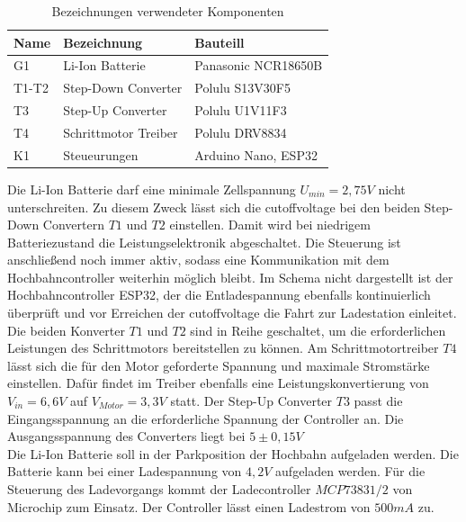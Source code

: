 \begin{table}[h]
	\begin{center}
		\begin{tabular}[h]{l|l|l}
			\textbf{Name} & \textbf{Bezeichnung} & \textbf{Bauteill}\\
			\hline
			G1 & Li-Ion Batterie & Panasonic NCR18650B\\
			\hline
			T1-T2 & Step-Down Converter & Polulu S13V30F5\\
			\hline
			T3 & Step-Up Converter & Polulu U1V11F3\\
			\hline
			T4 & Schrittmotor Treiber & Polulu DRV8834 \\
			\hline
			K1 & Steueurungen & Arduino Nano, ESP32 \\
		\end{tabular}
	\end{center}
	\caption{Bezeichnungen verwendeter Komponenten}
	\label{tbl:leistungskonvertierung}
\end{table}
\newpage

Die Li-Ion Batterie darf eine minimale Zellspannung $U_{min} =2,75V$ nicht unterschreiten. Zu diesem Zweck lässt sich die \acrshort{cutoffvoltage} bei den beiden Step-Down Convertern $T1$ und $T2$ einstellen. Damit wird bei  niedrigem Batteriezustand die Leistungselektronik abgeschaltet. Die Steuerung ist anschließend noch immer aktiv, sodass eine Kommunikation mit dem Hochbahncontroller weiterhin möglich bleibt. Im Schema nicht dargestellt ist der Hochbahncontroller ESP32, der die Entladespannung ebenfalls kontinuierlich überprüft und vor Erreichen der \acrshort{cutoffvoltage} die Fahrt zur Ladestation einleitet. Die beiden Konverter $T1$ und $T2$ sind in Reihe geschaltet, um die erforderlichen Leistungen des Schrittmotors bereitstellen zu können. Am Schrittmotortreiber $T4$ lässt sich die für den Motor geforderte Spannung und maximale Stromstärke einstellen. Dafür findet im Treiber ebenfalls eine Leistungskonvertierung von $V_{in}=6,6V$ auf $V_{Motor}=3,3V$ statt. Der Step-Up Converter $T3$ passt die Eingangsspannung an die erforderliche Spannung der Controller an. Die Ausgangsspannung des Converters liegt bei $5 \pm 0,15 V$ \\

Die Li-Ion Batterie soll in der Parkposition der Hochbahn aufgeladen werden. Die Batterie kann bei einer Ladespannung von $4,2V$ aufgeladen werden. Für die Steuerung des Ladevorgangs kommt der Ladecontroller $MCP73831/2$ von Microchip zum Einsatz. Der Controller lässt einen Ladestrom von $500mA$ zu. 


